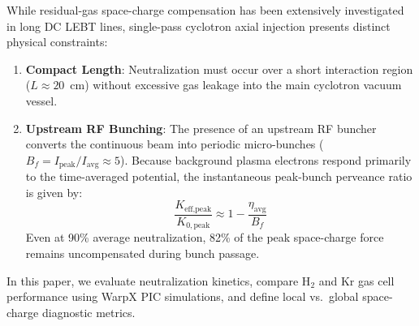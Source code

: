 \documentclass[banner]{jacow}
\begin{document}
While residual-gas space-charge compensation has been extensively investigated in long DC LEBT lines, single-pass cyclotron axial injection presents distinct physical constraints:
\begin{enumerate}
    \item \textbf{Compact Length}: Neutralization must occur over a short interaction region ($L \approx 20$~cm) without excessive gas leakage into the main cyclotron vacuum vessel.
    \item \textbf{Upstream RF Bunching}: The presence of an upstream RF buncher converts the continuous beam into periodic micro-bunches ($B_f = I_{\text{peak}} / I_{\text{avg}} \approx 5$). Because background plasma electrons respond primarily to the time-averaged potential, the instantaneous peak-bunch perveance ratio is given by:
    \begin{equation}
    \frac{K_{\text{eff,peak}}}{K_{0,\text{peak}}} \approx 1 - \frac{\eta_{\text{avg}}}{B_f}
    \end{equation}
    Even at 90\% average neutralization, 82\% of the peak space-charge force remains uncompensated during bunch passage.
\end{enumerate}

In this paper, we evaluate neutralization kinetics, compare H$_2$ and Kr gas cell performance using WarpX PIC simulations, and define local vs.\ global space-charge diagnostic metrics.
\end{document}
